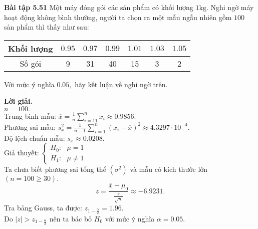 \begin{mybox}
\textbf{Bài tập 5.51} Một máy đóng gói các sản phẩm có khối lượng $1 \mathrm{kg}.$ Nghi ngờ máy hoạt động không bình thường, người ta chọn ra một mẫu ngẫu nhiên gồm $100$ sản phẩm thì thấy như sau:
\begin{table}[H]
\begin{tabular}{|c|c|c|c|c|c|c|}
\hline 
Khối lượng & $0.95$ & $0.97$ & $0.99$ & $1.01$ & $1.03$ & $1.05$ \\ 
\hline 
Số gói  & 9 & 31 & 40 & 15 & 3 & 2 \\ 
\hline 
\end{tabular} 
\end{table}
Với mức ý nghĩa $0.05,$ hãy kết luận về nghi ngờ trên.
\end{mybox}
\textbf{Lời giải.}\\
$n = 100.$\\
Trung bình mẫu:
$\overline x  = \frac{1}{n}\sum\limits_{i =1 1}^n {{x_i}}  \approx 0.9856.$\\
Phương sai mẫu: $s_x^2 = \frac{1}{{n - 1}}\sum\limits_{i = 1}^n {{{\left( {{x_i} - \overline x } \right)}^2}}  \approx 4.3297 \cdot 10^{-4}.$\\
Độ lệch chuẩn mẫu: ${s_x} \approx 0.0208.$\\
Giả thuyết: $\begin{cases}
H_0: \text{ } \mu = 1\\
H_1: \text{ } \mu \ne 1
\end{cases} $ \\
Ta chưa biết phương sai tổng thể $\left( {\sigma^2} \right)$ và mẫu có kích thước lớn $\left( {n = 100 \geqslant 30} \right).$
$$z = \frac{\overline{x} - \mu_0}{\frac{s}{\sqrt{n}}} \approx -6.9231.$$
Tra bảng Gauss, ta được: $z_{1 - \frac{\alpha}{2}} = 1.96.$\\
Do $\left| z \right| > z_{1 - \frac{\alpha}{2}}$ nên ta bác bỏ $H_0$ với mức ý nghĩa $\alpha = 0.05.$

